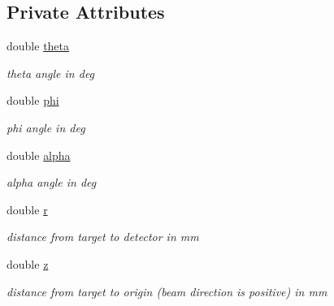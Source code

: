 \subsection*{Private Attributes}
\begin{DoxyCompactItemize}
\item 
\mbox{\label{class_m_b_geometry_a1bdb9b371a2cd9839cf471e501ba3e73}} 
double \hyperlink{class_m_b_geometry_a1bdb9b371a2cd9839cf471e501ba3e73}{theta}
\begin{DoxyCompactList}\small\item\em theta angle in deg \end{DoxyCompactList}\item 
\mbox{\label{class_m_b_geometry_a464c0fbdaaaaf45ede649138121be18b}} 
double \hyperlink{class_m_b_geometry_a464c0fbdaaaaf45ede649138121be18b}{phi}
\begin{DoxyCompactList}\small\item\em phi angle in deg \end{DoxyCompactList}\item 
\mbox{\label{class_m_b_geometry_ace0d3a561b209a84a82d5ea1c4498dbf}} 
double \hyperlink{class_m_b_geometry_ace0d3a561b209a84a82d5ea1c4498dbf}{alpha}
\begin{DoxyCompactList}\small\item\em alpha angle in deg \end{DoxyCompactList}\item 
\mbox{\label{class_m_b_geometry_af34aac40b2aed62a56371e9f90fcc093}} 
double \hyperlink{class_m_b_geometry_af34aac40b2aed62a56371e9f90fcc093}{r}
\begin{DoxyCompactList}\small\item\em distance from target to detector in mm \end{DoxyCompactList}\item 
\mbox{\label{class_m_b_geometry_aa9b711c815dcfe6ef82f54bca77d5646}} 
double \hyperlink{class_m_b_geometry_aa9b711c815dcfe6ef82f54bca77d5646}{z}
\begin{DoxyCompactList}\small\item\em distance from target to origin (beam direction is positive) in mm \end{DoxyCompactList}\item 

\end{DoxyCompactItemize}
